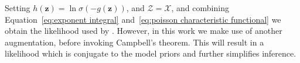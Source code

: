 \documentclass[twoside,11pt]{article}
\newcommand{\EE}[2]{\mathbb{E}_{#1}\left[ #2 \right]}
\newcommand{\set}[1]{\left\lbrace #1 \right\rbrace}
\newcommand{\bs}[1]{\boldsymbol{#1}}
\newcommand{\bx}{\boldsymbol{x}}
\newcommand{\X}{\mathcal{X}}
\begin{document}
Setting $h(\bs{z}) = \ln \sigma(-g(\bs{z}))$, and $\mathcal{Z}=\X$, and combining Equation~\eqref{eq:exponent integral} and~\eqref{eq:poisson characteristic functional} we obtain the likelihood used by \citet[Eq. 4]{adams2009tractable}. However, in this work we make use of another augmentation, before invoking Campbell's theorem. This will result in a likelihood which is conjugate to the model priors and further simplifies inference.

\end{document}
